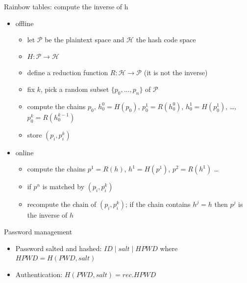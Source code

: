 \documentclass{beamer}
\begin{document}
\begin{frame}{Rainbow tables: compute the inverse of h}
  \begin{itemize}
    \item offline
      \begin{itemize}
      \item let $\mathcal{P}$ be the plaintext space and $\mathcal{H}$ the hash code space
      \item<2-> $H:\mathcal{P} \rightarrow \mathcal{H}$
      \item<3-> define a reduction function $R: \mathcal{H} \rightarrow \mathcal{P}$ (it is not the inverse)
      \item<4-> fix $k$, pick a random subset $\{p_0, \dots, p_n\}$ of $\mathcal{P}$
      \item<5-> compute the chains $p_0$, $h^0_0 = H(p_0)$, $p^1_0 = R(h^0_0)$, $h^1_0 = H(p^1_0)$, \dots, 
        $p^k_0 = R(h^{k-1}_0)$
      \item<6-> store $(p_i, p^k_i)$
      \end{itemize}
    \item online
      \begin{itemize}
      \item<7-> compute the chains $p^1=R(h)$, $h^1 = H(p^1)$, $p^2 = R(h^1)$ \dots
      \item<8-> if $p^n$ is matched by $(p_i, p^k_i)$ 
      \item<9-> recompute the chain of $(p_i, p^k_i)$; if the chain contains $h^j = h$ then $p^j$ is the inverse of $h$
      \end{itemize}
  \end{itemize}
\end{frame}


\begin{frame}{Password management}
  \begin{itemize}
    \item Password salted and hashed: $ID \mid salt \mid HPWD$ where $HPWD=H(PWD, salt)$ 
    \item Authentication: $H(PWD, salt) = rec.HPWD$
  \end{itemize}
\end{frame}
\end{document}
